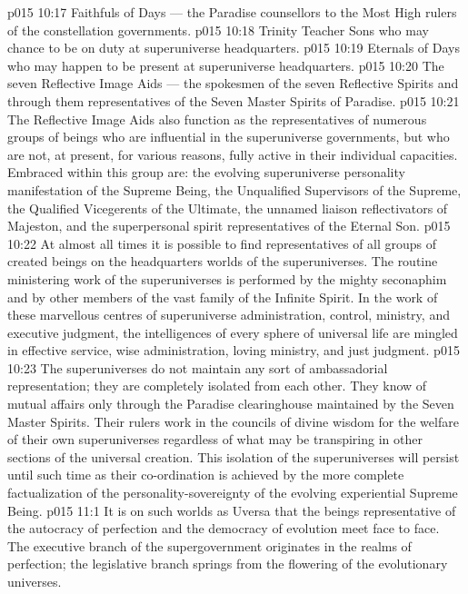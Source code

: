 \vs p015 10:17 \bibnobreakspace Faithfuls of Days --- the Paradise counsellors to the Most High rulers of the constellation governments.
\vs p015 10:18 \bibnobreakspace Trinity Teacher Sons who may chance to be on duty at superuniverse headquarters.
\vs p015 10:19 \bibnobreakspace Eternals of Days who may happen to be present at superuniverse headquarters.
\vs p015 10:20 \bibnobreakspace The seven Reflective Image Aids --- the spokesmen of the seven Reflective Spirits and through them representatives of the Seven Master Spirits of Paradise.
\vs p015 10:21 \pc The Reflective Image Aids also function as the representatives of numerous groups of beings who are influential in the superuniverse governments, but who are not, at present, for various reasons, fully active in their individual capacities. Embraced within this group are: the evolving superuniverse personality manifestation of the Supreme Being, the Unqualified Supervisors of the Supreme, the Qualified Vicegerents of the Ultimate, the unnamed liaison reflectivators of Majeston, and the superpersonal spirit representatives of the Eternal Son.
\vs p015 10:22 \pc At almost all times it is possible to find representatives of all groups of created beings on the headquarters worlds of the superuniverses. The routine ministering work of the superuniverses is performed by the mighty seconaphim and by other members of the vast family of the Infinite Spirit. In the work of these marvellous centres of superuniverse administration, control, ministry, and executive judgment, the intelligences of every sphere of universal life are mingled in effective service, wise administration, loving ministry, and just judgment.
\vs p015 10:23 The superuniverses do not maintain any sort of ambassadorial representation; they are completely isolated from each other. They know of mutual affairs only through the Paradise clearinghouse maintained by the Seven Master Spirits. Their rulers work in the councils of divine wisdom for the welfare of their own superuniverses regardless of what may be transpiring in other sections of the universal creation. This isolation of the superuniverses will persist until such time as their co\hyp{}ordination is achieved by the more complete factualization of the personality\hyp{}sovereignty of the evolving experiential Supreme Being.
\vs p015 11:1 It is on such worlds as Uversa that the beings representative of the autocracy of perfection and the democracy of evolution meet face to face. The executive branch of the supergovernment originates in the realms of perfection; the legislative branch springs from the flowering of the evolutionary universes.
